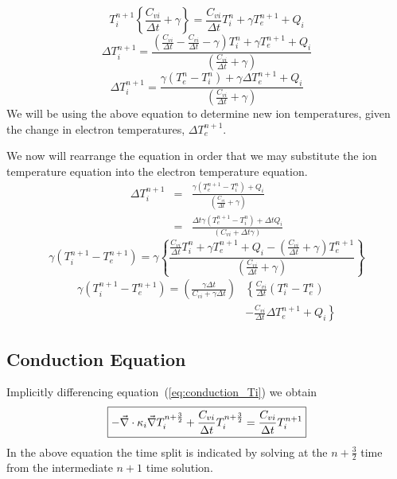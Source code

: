 \documentclass{article}
\newcommand{\dt}{\ensuremath{\Delta t}}
\newcommand{\cviOdt}{\ensuremath{\frac{C_{vi}}{\dt}}}
\begin{document}
\begin{equation}
	T_{i}^{n+1}\left\{ \cviOdt + \gamma \right\} =
		\cviOdt T_{i}^{n} + \gamma T_{e}^{n+1} + Q_{i}
\end{equation}
\begin{equation}
	\Delta T_{i}^{n+1} = \frac{ \left( \cviOdt - \cviOdt - \gamma 
					\right) T_{i}^{n}
			 + \gamma T_{e}^{n+1} + Q_{i} }
		{(\cviOdt + \gamma)}
\end{equation}
\begin{equation}
   \boxed{
	\Delta T_{i}^{n+1} = \frac{ \gamma ( T_{e}^{n} - T_{i}^{n} )
				+ \gamma \Delta T_{e}^{n+1} + Q_{i} }
		{(\cviOdt + \gamma)}
         }
\label{eq:Tinp1}
\end{equation}
We will be using the above equation to determine new ion temperatures,
given the change in electron temperatures, $\Delta T_{e}^{n+1}$.

We now will rearrange the equation in order that we may substitute the
ion temperature equation into the electron temperature equation.
\begin{eqnarray}
	\Delta T_{i}^{n+1} &=& \frac{ \gamma ( T_{e}^{n+1} - T_{i}^{n} )
				+ Q_{i} }{(\cviOdt + \gamma)} 
		\\
			   &=& \frac{ \dt \gamma
					 ( T_{e}^{n+1} - T_{i}^{n} )
				+ \dt Q_{i} }{(C_{vi} + \dt \gamma)}
\end{eqnarray}
\begin{equation}
	\gamma (T_{i}^{n+1}-T_{e}^{n+1}) =
		\gamma \left\{ \frac{\cviOdt T_{i}^{n} + \gamma T_{e}^{n+1}
				+ Q_{i} - (\cviOdt + \gamma) T_{e}^{n+1}}
				{(\cviOdt + \gamma)} \right\}
\end{equation}
\begin{equation}
   \boxed{
   \begin{split}
	\gamma (T_{i}^{n+1}-T_{e}^{n+1}) =
		\left(\frac{\gamma\dt}{C_{vi} + \gamma \dt} \right)
		&  \left\{\cviOdt(T_{i}^{n} - T_{e}^{n}) \right.
	\\
		& \left.
			- \cviOdt \Delta T_{e}^{n+1}
			+ Q_{i} \right\}
   \end{split}
   }
\label{eq:Ti}
\end{equation}

\subsection{Conduction Equation}

Implicitly differencing equation~(\ref{eq:conduction_Ti})
we obtain
\begin{equation}
  \boxed{
     - \vec{\nabla} \cdot \kappa_{i} \vec{\nabla} T^{n+\frac{3}{2}}_{i}
     + \frac{C_{vi}}{\Delta t} T^{n+\frac{3}{2}}_{i}
	   = \frac{C_{vi}}{\Delta t} T^{n+1}_{i}
  }
\label{eq:conduction_Ti_tdiff}	
\end{equation}
In the above equation the time split is indicated by solving at the
$n+\frac{3}{2}$ time from the intermediate $n+1$ time solution.
\end{document}
